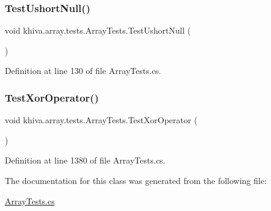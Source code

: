 \subsubsection{\texorpdfstring{Test\+Ushort\+Null()}{TestUshortNull()}}
{\footnotesize\ttfamily void khiva.\+array.\+tests.\+Array\+Tests.\+Test\+Ushort\+Null (\begin{DoxyParamCaption}{ }\end{DoxyParamCaption})\hspace{0.3cm}{\ttfamily [inline]}}



Definition at line 130 of file Array\+Tests.\+cs.

\mbox{\label{classkhiva_1_1array_1_1tests_1_1_array_tests_a04601c645a5f859378a6e5e01969ce9d}} 
\subsubsection{\texorpdfstring{Test\+Xor\+Operator()}{TestXorOperator()}}
{\footnotesize\ttfamily void khiva.\+array.\+tests.\+Array\+Tests.\+Test\+Xor\+Operator (\begin{DoxyParamCaption}{ }\end{DoxyParamCaption})\hspace{0.3cm}{\ttfamily [inline]}}



Definition at line 1380 of file Array\+Tests.\+cs.



The documentation for this class was generated from the following file\+:\begin{DoxyCompactItemize}
\item 
\mbox{\hyperlink{_array_tests_8cs}{Array\+Tests.\+cs}}\end{DoxyCompactItemize}
